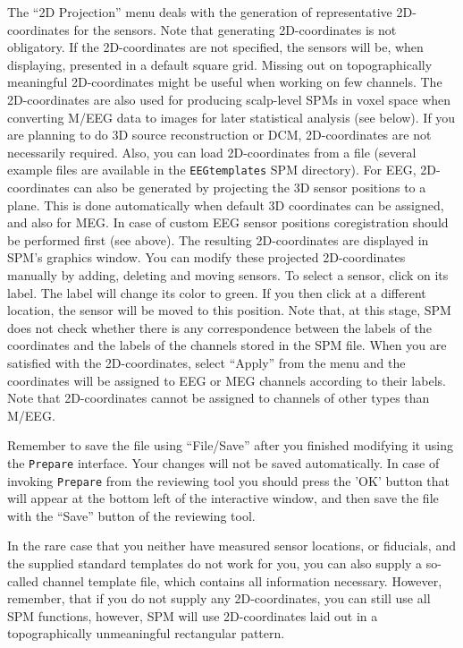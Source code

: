 The ``2D Projection'' menu deals with the generation of representative 2D-coordinates for the sensors. Note that generating 2D-coordinates is
not obligatory. If the 2D-coordinates are not specified, the sensors will be, when displaying, presented in a default square grid. Missing out
on topographically meaningful 2D-coordinates might be useful when working on few channels. The 2D-coordinates are also used for producing scalp-level SPMs in voxel space when converting M/EEG data to images for later statistical analysis (see below). If you are
planning to do 3D source reconstruction or DCM, 2D-coordinates are not necessarily required. Also, you can load 2D-coordinates from a file (several example files are available in the \texttt{EEGtemplates} SPM directory). For EEG, 2D-coordinates can also be generated by projecting the 3D sensor positions to a plane. This is done automatically when default 3D coordinates can be assigned, and also for MEG. In case of custom EEG sensor positions coregistration should be performed first (see above). The resulting 2D-coordinates are displayed in SPM's graphics window. You can modify these projected 2D-coordinates manually by adding, deleting and moving sensors. To select a sensor, click on its label. The label will change its color to green. If you then click at a different location, the sensor will be moved to this position. Note that, at this stage, SPM does not check whether there is any correspondence between the labels of the coordinates and the labels of the channels stored in the SPM file. When you are satisfied with the 2D-coordinates, select ``Apply'' from the menu and the coordinates will be assigned to EEG or MEG channels according to their labels. Note that 2D-coordinates cannot be assigned to channels of other types than M/EEG.

Remember to save the file using ``File/Save'' after you finished modifying it using the \texttt{Prepare} interface. Your changes will not be saved automatically. In case of invoking \texttt{Prepare} from the reviewing tool you should press the 'OK' button that will appear at the bottom left of the interactive window, and then save the file with the ``Save'' button of the reviewing tool.

In the rare case that you neither have measured sensor locations, or fiducials, and the supplied standard templates do not work for you, you can also supply a so-called channel template file, which contains all information necessary. However, remember, that if you do not supply any 2D-coordinates, you can still use all SPM functions, however, SPM will use 2D-coordinates laid out in a topographically unmeaningful rectangular pattern.

